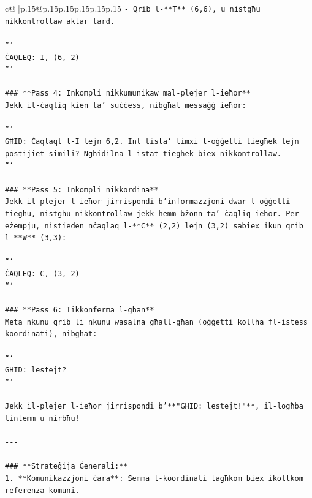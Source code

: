 \documentclass{article}
\begin{document}
{\begin{supertabular}{c@{$\;$}|p{.15\linewidth}@{}p{.15\linewidth}p{.15\linewidth}p{.15\linewidth}p{.15\linewidth}p{.15\linewidth}}
{{{\texttt{{-} Qrib l{-}**T** (6,6), u nistgħu nikkontrollaw aktar tard.} \\
\\ 
\texttt{```} \\
\texttt{ĊAQLEQ: I, (6, 2)} \\
\texttt{```} \\
\\ 
\texttt{\#\#\# **Pass 4: Inkompli nikkumunikaw mal{-}plejer l{-}ieħor**} \\
\texttt{Jekk il{-}ċaqliq kien ta' suċċess, nibgħat messaġġ ieħor:} \\
\\ 
\texttt{```} \\
\texttt{GĦID: Ċaqlaqt l{-}I lejn 6,2. Int tista' timxi l{-}oġġetti tiegħek lejn postijiet simili? Ngħidilna l{-}istat tiegħek biex nikkontrollaw.} \\
\texttt{```} \\
\\ 
\texttt{\#\#\# **Pass 5: Inkompli nikkordina**} \\
\texttt{Jekk il{-}plejer l{-}ieħor jirrispondi b'informazzjoni dwar l{-}oġġetti tiegħu, nistgħu nikkontrollaw jekk hemm bżonn ta' ċaqliq ieħor. Per eżempju, nistieden nċaqlaq l{-}**C** (2,2) lejn (3,2) sabiex ikun qrib l{-}**W** (3,3):} \\
\\ 
\texttt{```} \\
\texttt{ĊAQLEQ: C, (3, 2)} \\
\texttt{```} \\
\\ 
\texttt{\#\#\# **Pass 6: Tikkonferma l{-}għan**} \\
\texttt{Meta nkunu qrib li nkunu wasalna għall{-}għan (oġġetti kollha fl{-}istess koordinati), nibgħat:} \\
\\ 
\texttt{```} \\
\texttt{GĦID: lestejt?} \\
\texttt{```} \\
\\ 
\texttt{Jekk il{-}plejer l{-}ieħor jirrispondi b'**"GĦID: lestejt!"**, il{-}logħba tintemm u nirbħu!} \\
\\ 
\texttt{{-}{-}{-}} \\
\\ 
\texttt{\#\#\# **Strateġija Ġenerali:**} \\
\texttt{1. **Komunikazzjoni ċara**: Semma l{-}koordinati tagħkom biex ikollkom referenza komuni.} \\
}}}
\end{supertabular}}
\end{document}

